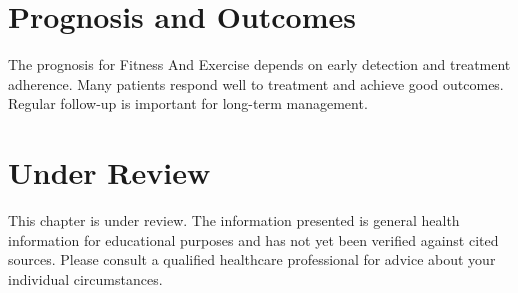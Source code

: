 \section*{Prognosis and Outcomes}
The prognosis for Fitness And Exercise depends on early detection and treatment adherence. Many patients respond well to treatment and achieve good outcomes. Regular follow-up is important for long-term management.
\section*{Under Review}
This chapter is under review. The information presented is general health information for educational purposes and has not yet been verified against cited sources. Please consult a qualified healthcare professional for advice about your individual circumstances.


\clearpage
